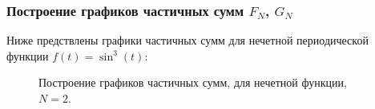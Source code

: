\documentclass[a5paper, 10pt]{article}
\theoremstyle{definition}
\theoremstyle{plain}
\theoremstyle{remark}
\begin{document}
\subsubsection{Построение графиков частичных сумм $F_N$, $G_N$}

Ниже предствлены графики частичных сумм для нечетной периодической функции $f(t) = \sin^3(t)$:

\begin{figure}[h]
\begin{minipage}[h]{0.5\linewidth}
\end{minipage}
\hfill
\begin{minipage}[h]{0.5\linewidth}
\end{minipage}
\caption{Построение графиков частичных сумм, для нечетной функции, $N=2$.}
\end{figure}
\end{document}

